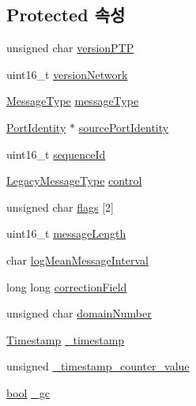 \subsection*{Protected 속성}
\begin{DoxyCompactItemize}
\item 
unsigned char \hyperlink{class_p_t_p_message_common_aebd1e0693c6170ff1b08b2471db92a80}{version\+P\+TP}
\item 
uint16\+\_\+t \hyperlink{class_p_t_p_message_common_a79d99d7b79ee6ad4bbd03b301ccccb53}{version\+Network}
\item 
\hyperlink{avbts__message_8hpp_ac6606ebe91c8ac66a2c314c79f5ab013}{Message\+Type} \hyperlink{class_p_t_p_message_common_adb32627aa5b0e2dbad3ccd88aab07c05}{message\+Type}
\item 
\hyperlink{class_port_identity}{Port\+Identity} $\ast$ \hyperlink{class_p_t_p_message_common_a415b5544bdd3ea41dae460fa1af900d9}{source\+Port\+Identity}
\item 
uint16\+\_\+t \hyperlink{class_p_t_p_message_common_a189710d5cff10c03f77d72a276a5f58e}{sequence\+Id}
\item 
\hyperlink{avbts__message_8hpp_ae57ea7de5f597c3449d03b9972ecf411}{Legacy\+Message\+Type} \hyperlink{class_p_t_p_message_common_a7de6f8422e6ca5ade1aeac73a44ec6f0}{control}
\item 
unsigned char \hyperlink{class_p_t_p_message_common_a8c2f6104634deb80d932fa0cd9166fba}{flags} \mbox{[}2\mbox{]}
\item 
uint16\+\_\+t \hyperlink{class_p_t_p_message_common_a6c490faee54bca860c4d897aae50990f}{message\+Length}
\item 
char \hyperlink{class_p_t_p_message_common_a2f897c329a52f79528d1b1248254dd1b}{log\+Mean\+Message\+Interval}
\item 
long long \hyperlink{class_p_t_p_message_common_a635b707dac6610b5b159be5c8ec1891e}{correction\+Field}
\item 
unsigned char \hyperlink{class_p_t_p_message_common_a0443527ff087aecea2cac4f6e84d189c}{domain\+Number}
\item 
\hyperlink{class_timestamp}{Timestamp} \hyperlink{class_p_t_p_message_common_aeafd115d5626f0602ab067a502d83d3e}{\+\_\+timestamp}
\item 
unsigned \hyperlink{class_p_t_p_message_common_a9d90ca571f84fe3633c7539e24783190}{\+\_\+timestamp\+\_\+counter\+\_\+value}
\item 
\hyperlink{avb__gptp_8h_af6a258d8f3ee5206d682d799316314b1}{bool} \hyperlink{class_p_t_p_message_common_a1b15d1687680708819ead19f82a970a9}{\+\_\+gc}
\end{DoxyCompactItemize}
